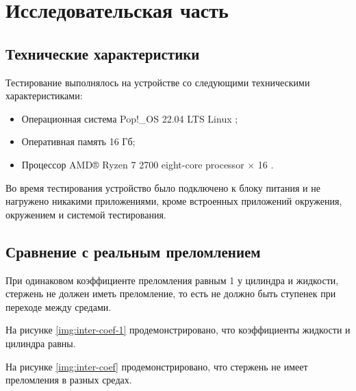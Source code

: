 \chapter{Исследовательская часть}

\section{Технические характеристики}
Тестирование выполнялось на устройстве со следующими техническими характеристиками:
\begin{itemize}
	\item Операционная система Pop!\_OS 22.04 LTS \cite{ubuntu} Linux \cite{linux};
	\item Оперативная память 16 Гб;
	\item Процессор AMD® Ryzen 7 2700 eight-core processor × 16 \cite{amd}.
\end{itemize}
Во время тестирования устройство было подключено к блоку питания и не нагружено никакими приложениями, кроме встроенных приложений окружения, окружением и системой тестирования.

\section{Сравнение с реальным преломлением}

При одинаковом коэффициенте преломления равным 1 у цилиндра и жидкости, стержень не должен иметь преломление, то есть не должно быть ступенек при переходе между средами.

На рисунке \ref{img:inter-coef-1} продемонстрировано, что коэффициенты жидкости и цилиндра равны. 

\begin{figure}[ht!]
\end{figure}

На рисунке \ref{img:inter-coef} продемонстрировано, что стержень не имеет преломления в разных средах. 


